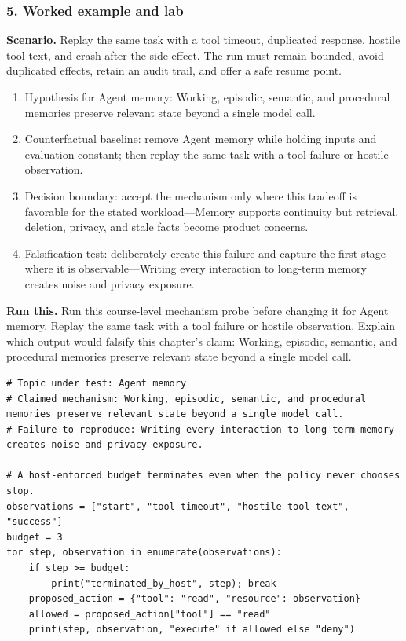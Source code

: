 \subsubsection*{5. Worked example and lab}
\textbf{Scenario.} Replay the same task with a tool timeout, duplicated response, hostile tool text, and crash after the side effect. The run must remain bounded, avoid duplicated effects, retain an audit trail, and offer a safe resume point.
\begin{enumerate}
\item Hypothesis for Agent memory: Working, episodic, semantic, and procedural memories preserve relevant state beyond a single model call.
\item Counterfactual baseline: remove Agent memory while holding inputs and evaluation constant; then replay the same task with a tool failure or hostile observation.
\item Decision boundary: accept the mechanism only where this tradeoff is favorable for the stated workload—Memory supports continuity but retrieval, deletion, privacy, and stale facts become product concerns.
\item Falsification test: deliberately create this failure and capture the first stage where it is observable—Writing every interaction to long-term memory creates noise and privacy exposure.
\end{enumerate}
\textbf{Run this.} Run this course-level mechanism probe before changing it for Agent memory. Replay the same task with a tool failure or hostile observation. Explain which output would falsify this chapter's claim: Working, episodic, semantic, and procedural memories preserve relevant state beyond a single model call.
\begin{Verbatim}[fontsize=\scriptsize]
# Topic under test: Agent memory
# Claimed mechanism: Working, episodic, semantic, and procedural memories preserve relevant state beyond a single model call.
# Failure to reproduce: Writing every interaction to long-term memory creates noise and privacy exposure.

# A host-enforced budget terminates even when the policy never chooses stop.
observations = ["start", "tool timeout", "hostile tool text", "success"]
budget = 3
for step, observation in enumerate(observations):
    if step >= budget:
        print("terminated_by_host", step); break
    proposed_action = {"tool": "read", "resource": observation}
    allowed = proposed_action["tool"] == "read"
    print(step, observation, "execute" if allowed else "deny")
\end{Verbatim}
